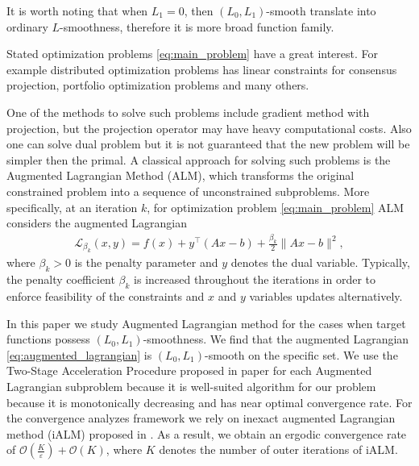 \documentclass[runningheads]{llncs}
\begin{document}
	It is worth noting that when $L_1=0$, then $(L_0,L_1)$-smooth translate into ordinary $L$-smoothness, therefore it is more broad function family.
	
	Stated optimization problems \eqref{eq:main_problem} have a great interest. For example distributed optimization problems \cite{boyd2011distributed} has linear constraints for consensus projection, portfolio optimization problems and many others. 
	
	One of the methods to solve such problems include gradient method with projection, but the projection operator may have heavy computational costs. Also one can solve dual problem but it is not guaranteed that the new problem will be simpler then the primal. A classical approach for solving such problems is the Augmented Lagrangian Method (ALM), which transforms the original constrained problem into a sequence of unconstrained subproblems. More specifically, at an iteration $k$, for optimization problem \ref{eq:main_problem} ALM considers the augmented Lagrangian
	\begin{align}
		\mathcal{L}_{\beta_k}(x,y)
		=
		f(x)
		+
		y^\top(Ax-b)
		+
		\frac{\beta_k}{2}\|Ax-b\|^2,
		\label{eq:augmented_lagrangian}
	\end{align}
	where $\beta_k>0$ is the penalty parameter and $y$ denotes the dual variable. Typically, the penalty coefficient $\beta_k$ is increased throughout the iterations in order to enforce feasibility of the constraints and $x$ and $y$ variables updates alternatively. 
	
	In this paper we study Augmented Lagrangian method for the cases when target functions possess $(L_0, L_1)$-smoothness. We find that the augmented Lagrangian \eqref{eq:augmented_lagrangian} is $(L_0,L_1)$-smooth on the specific set. We use the Two-Stage Acceleration Procedure proposed in paper \cite{vankov2025optimizing} for each Augmented Lagrangian subproblem because it is well-suited algorithm for our problem because it is monotonically decreasing and has near optimal convergence rate. For the convergence analyzes framework we rely on inexact augmented Lagrangian method (iALM) proposed in \cite{xu2021iteration}. As a result, we obtain an ergodic convergence rate of $\mathcal{O}(\frac{K}{\varepsilon}) + \mathcal{O}(K)$, where $K$ denotes the number of outer iterations of iALM. 
	
	
\end{document}

